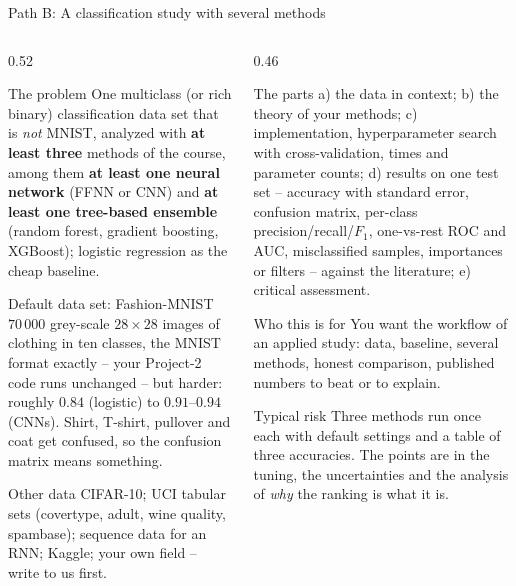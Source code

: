 \documentclass[10pt,aspectratio=169]{beamer}
\begin{document}
\begin{frame}{Path B: A classification study with several methods}
\scriptsize
\begin{columns}[T]
\begin{column}{0.52\textwidth}
\begin{block}{The problem}
One multiclass (or rich binary) classification data set that is \emph{not}
MNIST, analyzed with \textbf{at least three} methods of the course, among
them \textbf{at least one neural network} (FFNN or CNN) and \textbf{at
least one tree-based ensemble} (random forest, gradient boosting,
XGBoost); logistic regression as the cheap baseline.
\end{block}
\begin{block}{Default data set: Fashion-MNIST}
$70\,000$ grey-scale $28\times 28$ images of clothing in ten classes, the
MNIST format exactly -- your Project-2 code runs unchanged -- but harder:
roughly $0.84$ (logistic) to $0.91$--$0.94$ (CNNs).  Shirt, T-shirt,
pullover and coat get confused, so the confusion matrix means something.
\end{block}
\begin{block}{Other data}
CIFAR-10; UCI tabular sets (covertype, adult, wine quality, spambase);
sequence data for an RNN; Kaggle; your own field -- write to us first.
\end{block}
\end{column}
\begin{column}{0.46\textwidth}
\begin{block}{The parts}
a) the data in context; b) the theory of your methods; c) implementation,
hyperparameter search with cross-validation, times and parameter counts;
d) results on one test set -- accuracy with standard error, confusion
matrix, per-class precision/recall/$F_1$, one-vs-rest ROC and AUC,
misclassified samples, importances or filters -- against the literature;
e) critical assessment.
\end{block}
\begin{block}{Who this is for}
You want the workflow of an applied study: data, baseline, several methods,
honest comparison, published numbers to beat or to explain.
\end{block}
\begin{block}{Typical risk}
Three methods run once each with default settings and a table of three
accuracies.  The points are in the tuning, the uncertainties and the
analysis of \emph{why} the ranking is what it is.
\end{block}
\end{column}
\end{columns}
\end{frame}
\end{document}
